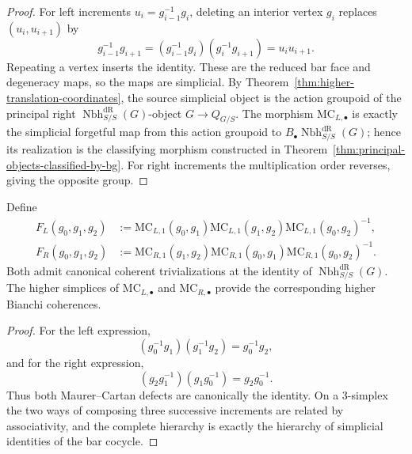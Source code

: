 \begin{proof}
For left increments $u_i=g_{i-1}^{-1}g_i$, deleting an interior vertex $g_i$
replaces $(u_i,u_{i+1})$ by
\[
    g_{i-1}^{-1}g_{i+1}
    =
    (g_{i-1}^{-1}g_i)(g_i^{-1}g_{i+1})
    =
    u_iu_{i+1}.
\]
Repeating a vertex inserts the identity.  These are the reduced bar face and
degeneracy maps, so the maps are simplicial.  By
Theorem~\ref{thm:higher-translation-coordinates}, the source simplicial object
is the action groupoid of the principal right $\operatorname{Nbh}^{\mathrm{dR}}_{S/S}(G)$-object
$G\to Q_{G/S}$.  The morphism $\mathrm{MC}_{L,\bullet}$ is exactly the simplicial
forgetful map from this action groupoid to $B_\bullet\operatorname{Nbh}^{\mathrm{dR}}_{S/S}(G)$; hence its
realization is the classifying morphism constructed in
Theorem~\ref{thm:principal-objects-classified-by-bg}.  For right increments the
multiplication order reverses, giving the opposite group.
\end{proof}

\begin{proposition}
\label{prop:integrated-curvature}
Define
\[
\begin{aligned}
    F_L(g_0,g_1,g_2)
    &:=
    \mathrm{MC}_{L,1}(g_0,g_1)
    \mathrm{MC}_{L,1}(g_1,g_2)
    \mathrm{MC}_{L,1}(g_0,g_2)^{-1},\\
    F_R(g_0,g_1,g_2)
    &:=
    \mathrm{MC}_{R,1}(g_1,g_2)
    \mathrm{MC}_{R,1}(g_0,g_1)
    \mathrm{MC}_{R,1}(g_0,g_2)^{-1}.
\end{aligned}
\]
Both admit canonical coherent trivializations at the identity of $\operatorname{Nbh}^{\mathrm{dR}}_{S/S}(G)$.  The
higher simplices of $\mathrm{MC}_{L,\bullet}$ and $\mathrm{MC}_{R,\bullet}$ provide the corresponding higher
Bianchi coherences.
\end{proposition}

\begin{proof}
For the left expression,
\[
    (g_0^{-1}g_1)(g_1^{-1}g_2)
    =
    g_0^{-1}g_2,
\]
and for the right expression,
\[
    (g_2g_1^{-1})(g_1g_0^{-1})
    =
    g_2g_0^{-1}.
\]
Thus both Maurer--Cartan defects are canonically the identity.  On a $3$-simplex the two
ways of composing three successive increments are related by associativity,
and the complete hierarchy is exactly the hierarchy of simplicial identities
of the bar cocycle.
\end{proof}

